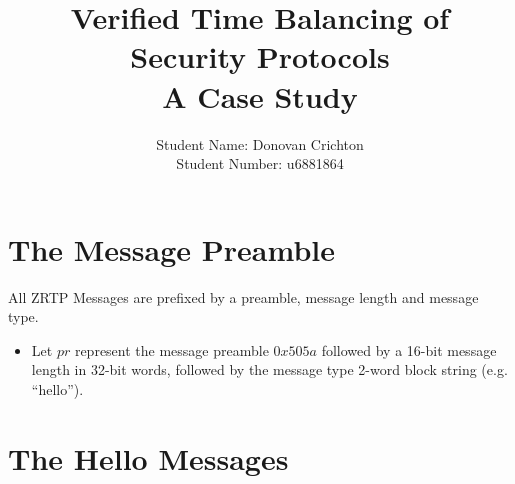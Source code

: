 \documentclass[11pt]{article}
\title{Verified Time Balancing of Security Protocols 
  \\ \large A Case Study}
\author{Student Name: Donovan Crichton\\
Student Number: u6881864}
\date{}
\begin{document}
\maketitle
  \section{The Message Preamble}
  All ZRTP Messages are prefixed by a preamble, message length
  and message type. 
  \begin{itemize}
  \item Let $pr$ represent the message preamble $0x505a$ followed
        by a 16-bit message length in 32-bit words, followed by the 
        message type 2-word block string (e.g. ``hello'').
  \end{itemize}
  \section{The Hello Messages}
\end{document}
